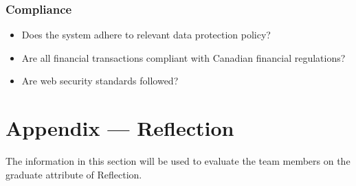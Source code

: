 \documentclass[12pt, titlepage]{article}
\begin{document}
\hypertarget{checklist-nfr17}{}
\subsubsection{Compliance}
  \begin{itemize} %
    \item Does the system adhere to relevant data protection policy?
    \item Are all financial transactions compliant with Canadian financial regulations?
    \item Are web security standards followed?
  \end{itemize}

\newpage
\section*{Appendix --- Reflection}

The information in this section will be used to evaluate the team members on the
graduate attribute of Reflection.


\end{document}
